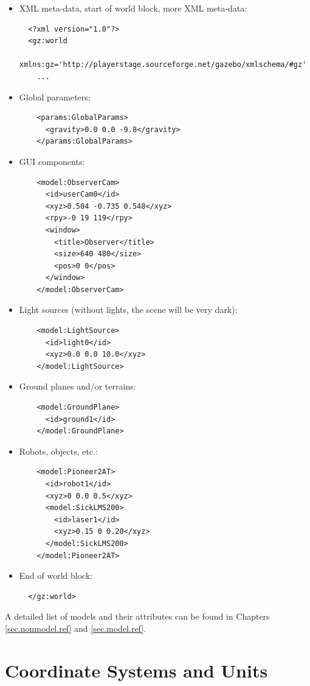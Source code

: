 \documentclass[11pt]{report}
\begin{document}
\begin{itemize}
%
\item XML meta-data, start of world block, more XML meta-data:
\begin{verbatim}
  <?xml version="1.0"?>
  <gz:world 
    xmlns:gz='http://playerstage.sourceforge.net/gazebo/xmlschema/#gz'
    ...
\end{verbatim}
%
\item Global parameters:
\begin{verbatim}
    <params:GlobalParams>
      <gravity>0.0 0.0 -9.8</gravity>
    </params:GlobalParams>
\end{verbatim}
%
\item GUI components:
\begin{verbatim}
    <model:ObserverCam>
      <id>userCam0</id>
      <xyz>0.504 -0.735 0.548</xyz>
      <rpy>-0 19 119</rpy>
      <window>
        <title>Observer</title>
        <size>640 480</size>
        <pos>0 0</pos>
      </window>
    </model:ObserverCam>
\end{verbatim}
%
\item Light sources (without lights, the scene will be very dark):
\begin{verbatim}
    <model:LightSource>
      <id>light0</id>
      <xyz>0.0 0.0 10.0</xyz>
    </model:LightSource>
\end{verbatim}
%
\item Ground planes and/or terrains:
\begin{verbatim}
    <model:GroundPlane>
      <id>ground1</id>
    </model:GroundPlane>
\end{verbatim}
%
\item Robots, objects, etc.:
\begin{verbatim}
    <model:Pioneer2AT>
      <id>robot1</id>
      <xyz>0 0.0 0.5</xyz>
      <model:SickLMS200>
        <id>laser1</id>
        <xyz>0.15 0 0.20</xyz>
      </model:SickLMS200>
    </model:Pioneer2AT>
\end{verbatim}
%
\item End of world block:
\begin{verbatim}
  </gz:world>
\end{verbatim}
\end{itemize}
%
A detailed list of models and their attributes can be found in
Chapters \ref{sec.nonmodel.ref} and \ref{sec.model.ref}.


\section{Coordinate Systems and Units}
\label{sec.world.units}
\end{document}
